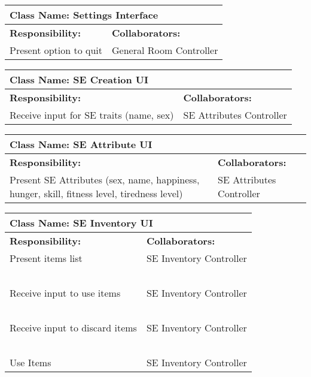 \documentclass[]{article}
\begin{document}
\begin{table}[H]
    \centering
    \begin{tabular}{|p{7.5cm}|p{7.5cm}|}
        \hline
        \multicolumn{2}{|l|}{\textbf{Class Name:} Settings Interface}\\
        \hline
        \textbf{Responsibility:} & \textbf{Collaborators:}\\
        \hline
        Present option to quit & General Room Controller\\
        \hline
    \end{tabular}
\end{table}

\begin{table}[H]
    \centering
    \begin{tabular}{|p{7.5cm}|p{7.5cm}|}
        \hline
        \multicolumn{2}{|l|}{\textbf{Class Name:} SE Creation UI}\\
        \hline
        \textbf{Responsibility:} & \textbf{Collaborators:}\\
        \hline
        Receive input for SE traits (name, sex) & SE Attributes Controller\\
        \hline
    \end{tabular}
\end{table}

\begin{table}[H]
    \centering
    \begin{tabular}{|p{7.5cm}|p{7.5cm}|}
        \hline
        \multicolumn{2}{|l|}{\textbf{Class Name:} SE Attribute UI}\\
        \hline
        \textbf{Responsibility:} & \textbf{Collaborators:}\\
        \hline
        Present SE Attributes (sex, name, happiness, hunger, skill, fitness level, tiredness level) & SE Attributes Controller\\
        \hline
    \end{tabular}
\end{table}

\begin{table}[H]
    \centering
    \begin{tabular}{|p{7.5cm}|p{7.5cm}|}
        \hline
        \multicolumn{2}{|l|}{\textbf{Class Name:} SE Inventory UI}\\
        \hline
        \textbf{Responsibility:} & \textbf{Collaborators:}\\
        \hline
        Present items list & SE Inventory Controller\\
        ~ & ~\\
        Receive input to use items & SE Inventory Controller\\
        ~ & ~\\
        Receive input to discard items & SE Inventory Controller\\
        ~ & ~\\
        Use Items & SE Inventory Controller\\
        \hline
    \end{tabular}
\end{table}
\end{document}
